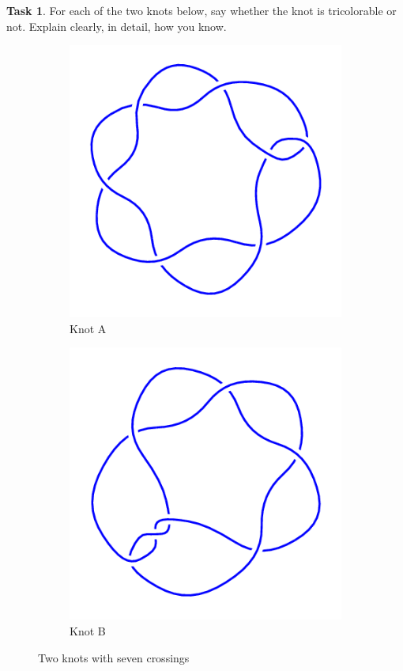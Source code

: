 \documentclass[12pt,letterpaper]{article}
\theoremstyle{definition}
\newtheorem{task}{Task}
\begin{document}
\begin{task}
For each of the two knots below, say whether the knot is tricolorable or not. Explain clearly, in detail, how you know.
\begin{figure}[h]
    \centering
    \begin{subfigure}{.25\textwidth}
        \centering
        \includegraphics[width=\textwidth]{knotpics/7_2.png}
        \caption{Knot A}
    \end{subfigure}
    \qquad\qquad\qquad
    \begin{subfigure}{.25\textwidth}
        \centering
        \includegraphics[width=\textwidth]{knotpics/7_3mirror.png}
        \caption{Knot B}
    \end{subfigure}
    \caption{Two knots with seven crossings}
\end{figure}
\end{task}
\end{document}
